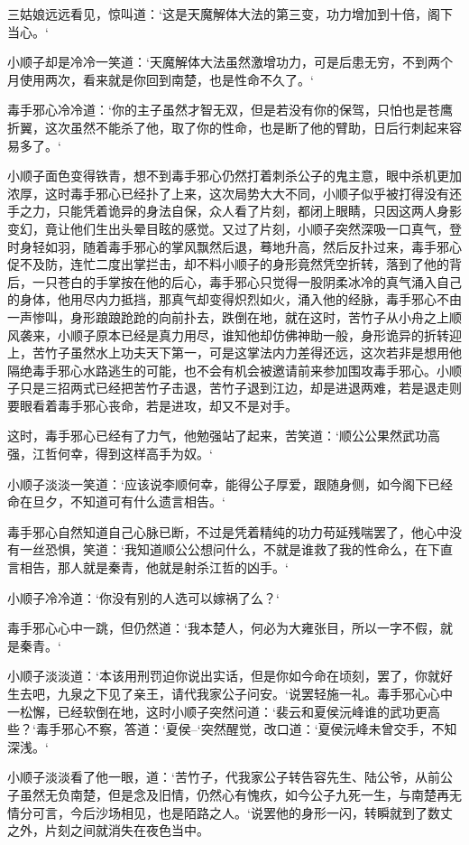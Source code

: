 三姑娘远远看见，惊叫道：‘这是天魔解体大法的第三变，功力增加到十倍，阁下当心。‘

小顺子却是冷冷一笑道：‘天魔解体大法虽然激增功力，可是后患无穷，不到两个月使用两次，看来就是你回到南楚，也是性命不久了。‘

毒手邪心冷冷道：‘你的主子虽然才智无双，但是若没有你的保驾，只怕也是苍鹰折翼，这次虽然不能杀了他，取了你的性命，也是断了他的臂助，日后行刺起来容易多了。‘

小顺子面色变得铁青，想不到毒手邪心仍然打着刺杀公子的鬼主意，眼中杀机更加浓厚，这时毒手邪心已经扑了上来，这次局势大大不同，小顺子似乎被打得没有还手之力，只能凭着诡异的身法自保，众人看了片刻，都闭上眼睛，只因这两人身影变幻，竟让他们生出头晕目眩的感觉。又过了片刻，小顺子突然深吸一口真气，登时身轻如羽，随着毒手邪心的掌风飘然后退，蓦地升高，然后反扑过来，毒手邪心促不及防，连忙二度出掌拦击，却不料小顺子的身形竟然凭空折转，落到了他的背后，一只苍白的手掌按在他的后心，毒手邪心只觉得一股阴柔冰冷的真气涌入自己的身体，他用尽内力抵挡，那真气却变得炽烈如火，涌入他的经脉，毒手邪心不由一声惨叫，身形踉踉跄跄的向前扑去，跌倒在地，就在这时，苦竹子从小舟之上顺风袭来，小顺子原本已经是真力用尽，谁知他却仿佛神助一般，身形诡异的折转迎上，苦竹子虽然水上功夫天下第一，可是这掌法内力差得还远，这次若非是想用他隔绝毒手邪心水路逃生的可能，也不会有机会被邀请前来参加围攻毒手邪心。小顺子只是三招两式已经把苦竹子击退，苦竹子退到江边，却是进退两难，若是退走则要眼看着毒手邪心丧命，若是进攻，却又不是对手。

这时，毒手邪心已经有了力气，他勉强站了起来，苦笑道：‘顺公公果然武功高强，江哲何幸，得到这样高手为奴。‘

小顺子淡淡一笑道：‘应该说李顺何幸，能得公子厚爱，跟随身侧，如今阁下已经命在旦夕，不知道可有什么遗言相告。‘

毒手邪心自然知道自己心脉已断，不过是凭着精纯的功力苟延残喘罢了，他心中没有一丝恐惧，笑道：‘我知道顺公公想问什么，不就是谁救了我的性命么，在下直言相告，那人就是秦青，他就是射杀江哲的凶手。‘

小顺子冷冷道：‘你没有别的人选可以嫁祸了么？‘

毒手邪心心中一跳，但仍然道：‘我本楚人，何必为大雍张目，所以一字不假，就是秦青。‘

小顺子淡淡道：‘本该用刑罚迫你说出实话，但是你如今命在顷刻，罢了，你就好生去吧，九泉之下见了亲王，请代我家公子问安。‘说罢轻施一礼。毒手邪心心中一松懈，已经软倒在地，这时小顺子突然问道：‘裴云和夏侯沅峰谁的武功更高些？‘毒手邪心不察，答道：‘夏侯--‘突然醒觉，改口道：‘夏侯沅峰未曾交手，不知深浅。‘

小顺子淡淡看了他一眼，道：‘苦竹子，代我家公子转告容先生、陆公爷，从前公子虽然无负南楚，但是念及旧情，仍然心有愧疚，如今公子九死一生，与南楚再无情分可言，今后沙场相见，也是陌路之人。‘说罢他的身形一闪，转瞬就到了数丈之外，片刻之间就消失在夜色当中。

